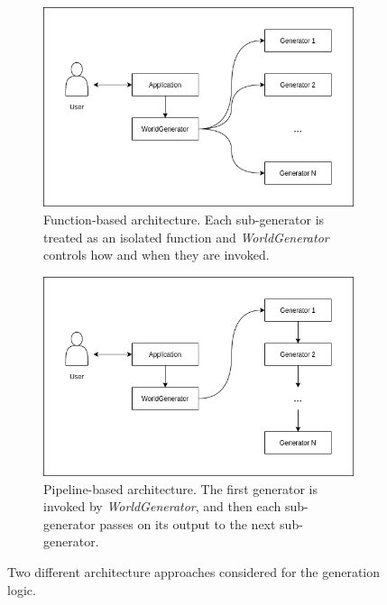 \begin{figure}[h!]
  \centering
  \begin{subfigure}[b]{0.48\textwidth}
    \includegraphics[width=\textwidth]{figure/architecture_functions.png}
    \caption{Function-based architecture. Each sub-generator is treated as an isolated function and \textit{WorldGenerator} controls how and when they are invoked.}
  \end{subfigure}
  \quad
  \begin{subfigure}[b]{0.48\textwidth}
    \includegraphics[width=\textwidth]{figure/architecture_pipeline.png}
    \caption{Pipeline-based architecture. The first generator is invoked by \textit{WorldGenerator}, and then each sub-generator passes on its output to the next sub-generator.}
  \end{subfigure}

  \caption{Two different architecture approaches considered for the generation logic.}
  \label{fig:architecture_approaches}
\end{figure}

